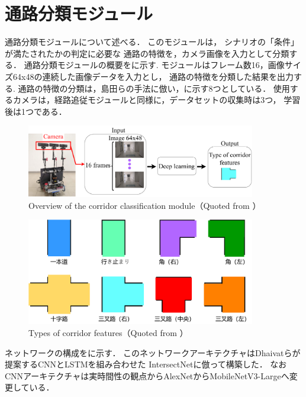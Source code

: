 \clearpage
\section{通路分類モジュール}
\label{sec:intersection}
通路分類モジュールについて述べる．
このモジュールは，
シナリオの「条件」が満たされたかの判定に必要な
通路の特徴を，カメラ画像を入力として分類する．
通路分類モジュールの概要をに示す.
モジュールはフレーム数16，画像サイズ64x48の連続した画像データを入力とし，
通路の特徴を分類した結果を出力する.
通路の特徴の分類は，島田らの手法に倣い，に示す8つとしている．
使用するカメラは，経路追従モジュールと同様に，データセットの収集時は3つ，
学習後は1つである．

\begin{figure}[htbp]
    \centering
     \includegraphics[width=100mm]{images/pdf/intersection_abs.pdf}
     \caption[Overview of the corridor classification module]{Overview of the corridor classification module（Quoted from \cite{haruyama2023}）}
     \label{fig:intersection_abs}
\end{figure}
\begin{figure}[htbp]
    \centering
     \includegraphics[width=100mm]{images/pdf/class.pdf}
     \caption[Types of corridor features]{Types of corridor features（Quoted from \cite{haruyama2023}）}
     \label{fig:class}
\end{figure}
\newpage

ネットワークの構成をに示す．
このネットワークアーキテクチャはDhaivatら\cite{lrcn}が提案するCNNとLSTMを組み合わせた
IntersectNetに倣って構築した．
なおCNNアーキテクチャは実時間性の観点からAlexNet\cite{alex}からMobileNetV3-Large\cite{v3}へ変更している．

